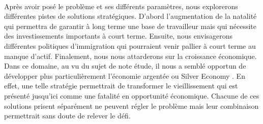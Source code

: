 \paragraph{}Après avoir posé le problème et ses différents paramètres, nous explorerons différentes pistes de solutions stratégiques. D’abord l’augmentation de la natalité qui permettra de garantir à long terme une base de travailleur mais qui nécessite des investissements importants à court terme. Ensuite, nous envisagerons différentes politiques  d’immigration qui pourraient venir pallier à court terme au manque d’actif. Finalement, nous nous attarderons sur la croissance économique. Dans ce domaine, au vu du sujet de note étude, il nous a semblé opportun de développer plus particulièrement l’économie argentée ou Silver Economy . En effet, une telle stratégie permettrait de transformer le vieillissement qui est présenté jusqu’ici comme une fatalité en opportunité économique. Chacune de ces solutions prisent séparément ne peuvent régler le problème mais leur combinaison permettrait sans doute de relever le défi.  
